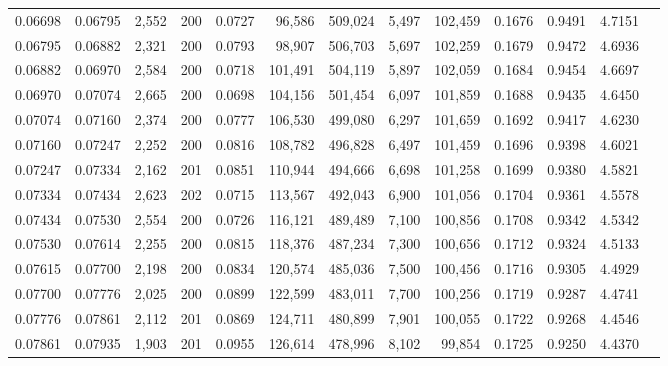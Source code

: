 \begin{tabular}{rrrrrrrrrrrrr}
0.06698 & 0.06795 & 2,552 & 200 &                                     0.0727 &  96,586 & 509,024 &   5,497 & 102,459 & 0.1676 & 0.9491 & 4.7151 \\
0.06795 & 0.06882 & 2,321 & 200 &                                     0.0793 &  98,907 & 506,703 &   5,697 & 102,259 & 0.1679 & 0.9472 & 4.6936 \\
0.06882 & 0.06970 & 2,584 & 200 &                                     0.0718 & 101,491 & 504,119 &   5,897 & 102,059 & 0.1684 & 0.9454 & 4.6697 \\
0.06970 & 0.07074 & 2,665 & 200 &                                     0.0698 & 104,156 & 501,454 &   6,097 & 101,859 & 0.1688 & 0.9435 & 4.6450 \\
0.07074 & 0.07160 & 2,374 & 200 &                                     0.0777 & 106,530 & 499,080 &   6,297 & 101,659 & 0.1692 & 0.9417 & 4.6230 \\
0.07160 & 0.07247 & 2,252 & 200 &                                     0.0816 & 108,782 & 496,828 &   6,497 & 101,459 & 0.1696 & 0.9398 & 4.6021 \\
0.07247 & 0.07334 & 2,162 & 201 &                                     0.0851 & 110,944 & 494,666 &   6,698 & 101,258 & 0.1699 & 0.9380 & 4.5821 \\
0.07334 & 0.07434 & 2,623 & 202 &                                     0.0715 & 113,567 & 492,043 &   6,900 & 101,056 & 0.1704 & 0.9361 & 4.5578 \\
0.07434 & 0.07530 & 2,554 & 200 &                                     0.0726 & 116,121 & 489,489 &   7,100 & 100,856 & 0.1708 & 0.9342 & 4.5342 \\
0.07530 & 0.07614 & 2,255 & 200 &                                     0.0815 & 118,376 & 487,234 &   7,300 & 100,656 & 0.1712 & 0.9324 & 4.5133 \\
0.07615 & 0.07700 & 2,198 & 200 &                                     0.0834 & 120,574 & 485,036 &   7,500 & 100,456 & 0.1716 & 0.9305 & 4.4929 \\
0.07700 & 0.07776 & 2,025 & 200 &                                     0.0899 & 122,599 & 483,011 &   7,700 & 100,256 & 0.1719 & 0.9287 & 4.4741 \\
0.07776 & 0.07861 & 2,112 & 201 &                                     0.0869 & 124,711 & 480,899 &   7,901 & 100,055 & 0.1722 & 0.9268 & 4.4546 \\
0.07861 & 0.07935 & 1,903 & 201 &                                     0.0955 & 126,614 & 478,996 &   8,102 &  99,854 & 0.1725 & 0.9250 & 4.4370 \\

\end{tabular}
